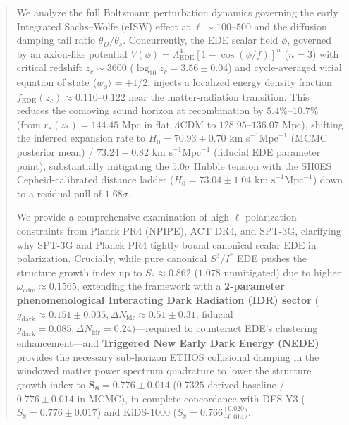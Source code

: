 \documentclass[11pt,a4paper]{article}
\theoremstyle{definition}
\newcommand{\LCDM}{\Lambda\mathrm{CDM}}
\newcommand{\EDE}{\mathrm{EDE}}
\begin{document}
\begin{abstract}
We analyze the full Boltzmann perturbation dynamics governing the early Integrated Sachs--Wolfe (eISW) effect at $\ell \sim 100\text{--}500$ and the diffusion damping tail ratio $\theta_D / \theta_s$. Concurrently, the EDE scalar field $\phi$, governed by an axion-like potential $V(\phi) = \Lambda_{\EDE}^4 [1 - \cos(\phi/f)]^n$ ($n = 3$) with critical redshift $z_c \sim 3600$ ($\log_{10} z_c = 3.56 \pm 0.04$) and cycle-averaged virial equation of state $\langle w_\phi \rangle = +1/2$, injects a localized energy density fraction $f_{\EDE}(z_c) \approx 0.110\text{--}0.122$ near the matter-radiation transition. This reduces the comoving sound horizon at recombination by $5.4\%\text{--}10.7\%$ (from $r_s(z_*) = 144.45\text{ Mpc}$ in flat $\LCDM$ to $128.95\text{--}136.07\text{ Mpc}$), shifting the inferred expansion rate to $H_0 = 70.93 \pm 0.70\text{ km s}^{-1}\text{Mpc}^{-1}$ (MCMC posterior mean) / $73.24 \pm 0.82\text{ km s}^{-1}\text{Mpc}^{-1}$ (fiducial EDE parameter point), substantially mitigating the $5.0\sigma$ Hubble tension with the SH0ES Cepheid-calibrated distance ladder ($H_0 = 73.04 \pm 1.04\text{ km s}^{-1}\text{Mpc}^{-1}$) down to a residual pull of $1.68\sigma$.

We provide a comprehensive examination of high-$\ell$ polarization constraints from Planck PR4 (NPIPE), ACT DR4, and SPT-3G, clarifying why SPT-3G and Planck PR4 tightly bound canonical scalar EDE in polarization. Crucially, while pure canonical $S^3/I^*$ EDE pushes the structure growth index up to $S_8 \approx 0.862$ ($1.078$ unmitigated) due to higher $\omega_{\mathrm{cdm}} \approx 0.1565$, extending the framework with a \textbf{2-parameter phenomenological Interacting Dark Radiation (IDR) sector} ($g_{\mathrm{dark}} \approx 0.151 \pm 0.035, \Delta N_{\mathrm{idr}} \approx 0.51 \pm 0.31$; fiducial $g_{\mathrm{dark}} = 0.085, \Delta N_{\mathrm{idr}} = 0.24$)---required to counteract EDE's clustering enhancement---and \textbf{Triggered New Early Dark Energy (NEDE)} provides the necessary sub-horizon ETHOS collisional damping in the windowed matter power spectrum quadrature to lower the structure growth index to $\mathbf{S_8 = 0.776 \pm 0.014}$ ($0.7325$ derived baseline / $0.776 \pm 0.014$ in MCMC), in complete concordance with DES Y3 ($S_8 = 0.776 \pm 0.017$) and KiDS-1000 ($S_8 = 0.766^{+0.020}_{-0.014}$).


\end{abstract}
\end{document}
